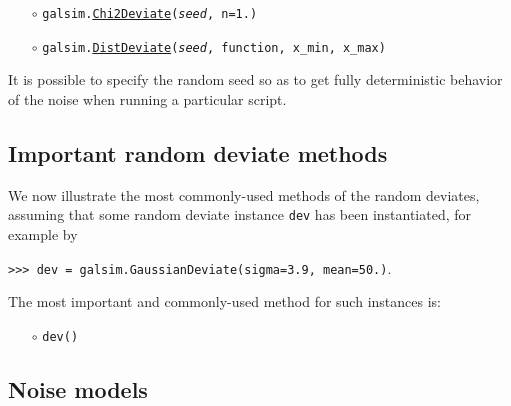 \documentclass[preprint,10pt]{../../devel/modules/aastex}
\begin{document}
\begin{itemize}
\item[$\circ$] \texttt{galsim.\href{http://galsim-developers.github.io/GalSim/classgalsim_1_1_chi2_deviate.html}{Chi2Deviate}(\emph{seed}, n=1.)} 

\item[$\circ$] \texttt{galsim.\href{http://galsim-developers.github.io/GalSim/classgalsim_1_1random_1_1_dist_deviate.html}{DistDeviate}(\emph{seed}, function, x\_min, x\_max)}  

\end{itemize}

It is possible to specify the random seed so as to get fully
deterministic behavior of the noise when running a particular script.

\subsection{Important random deviate methods}\label{sect:randommethods}
We now illustrate the most commonly-used methods of the random
deviates, assuming that some random deviate instance \texttt{dev} has
been instantiated, for example by

\texttt{>>> dev = galsim.GaussianDeviate(sigma=3.9, mean=50.)}.

The most important and commonly-used method for such
instances is:
\begin{itemize}

\item[$\circ$] \texttt{dev()} 

\end{itemize}

\subsection{Noise models}\label{sect:noisemodels}
\end{document}
